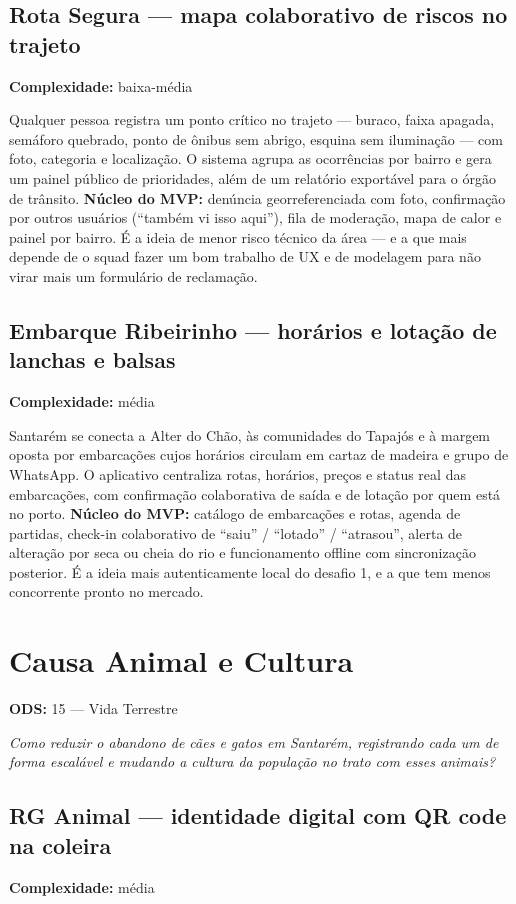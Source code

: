 \documentclass[11pt,a4paper]{article}
\newcommand{\complex}[1]{{\small\color{cinza}\textbf{Complexidade:} #1}}
\newcommand{\ods}[1]{{\small\color{verde}\textbf{ODS:} #1}}
\begin{document}
\subsection{Rota Segura --- mapa colaborativo de riscos no trajeto}
\complex{baixa-média}

Qualquer pessoa registra um ponto crítico no trajeto --- buraco, faixa apagada, semáforo quebrado,
ponto de ônibus sem abrigo, esquina sem iluminação --- com foto, categoria e localização. O sistema
agrupa as ocorrências por bairro e gera um painel público de prioridades, além de um relatório
exportável para o órgão de trânsito. \textbf{Núcleo do MVP:} denúncia georreferenciada com foto,
confirmação por outros usuários (``também vi isso aqui''), fila de moderação, mapa de calor e
painel por bairro. É a ideia de menor risco técnico da área --- e a que mais depende de o squad
fazer um bom trabalho de UX e de modelagem para não virar mais um formulário de reclamação.

\subsection{Embarque Ribeirinho --- horários e lotação de lanchas e balsas}
\complex{média}

Santarém se conecta a Alter do Chão, às comunidades do Tapajós e à margem oposta por embarcações
cujos horários circulam em cartaz de madeira e grupo de WhatsApp. O aplicativo centraliza rotas,
horários, preços e status real das embarcações, com confirmação colaborativa de saída e de lotação
por quem está no porto. \textbf{Núcleo do MVP:} catálogo de embarcações e rotas, agenda de partidas,
check-in colaborativo de ``saiu'' / ``lotado'' / ``atrasou'', alerta de alteração por seca ou cheia
do rio e funcionamento offline com sincronização posterior. É a ideia mais autenticamente local do
desafio 1, e a que tem menos concorrente pronto no mercado.

\newpage

\section{Causa Animal e Cultura}
\ods{15 --- Vida Terrestre}

\emph{Como reduzir o abandono de cães e gatos em Santarém, registrando cada um de forma escalável
e mudando a cultura da população no trato com esses animais?}

\subsection{RG Animal --- identidade digital com QR code na coleira}
\complex{média}
\end{document}

